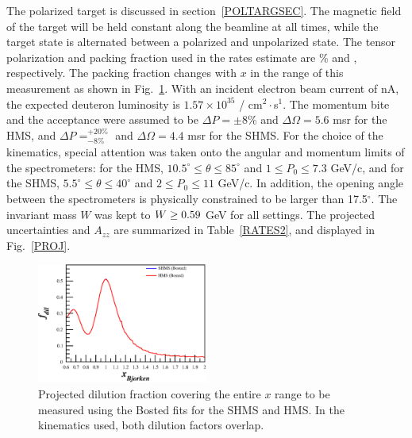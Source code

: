 The polarized \TARGET target is discussed in section~\ref{POLTARGSEC}.  The magnetic field of the target will be held constant along the beamline at all times, while the target state is alternated between a polarized and unpolarized state.
The tensor polarization and packing fraction used in the rates estimate are \PZZ\% and \PF, respectively. 
The packing fraction changes with $x$ in the range of this measurement as shown in Fig.~\ref{fdil_plot}.
With an incident
electron beam current of \CURRENT nA, the
expected deuteron luminosity is $1.57\times 10^{35}$ / cm$^2\cdot$s$^1$. The momentum bite and the acceptance
were assumed to be $\Delta P = \pm 8\%$ and $\Delta\Omega = 5.6$ msr for the HMS, and $\Delta P= ^{+20\%}_{-8\%}$ 
and $\Delta\Omega =4.4$ msr for the SHMS. 
%
For the choice of the kinematics,
special attention was taken onto the angular and momentum limits of the spectrometers: for the
HMS, $10.5^{\circ} \le \theta \le 85^{\circ}$ and $1 \le P_0 \le 7.3$ GeV/c, and for the SHMS,
$5.5^{\circ} \le \theta \le 40^{\circ}$ and $2 \le P_0 \le 11$ GeV/c. In addition, the
opening angle between the spectrometers is physically constrained to be larger than 17.5$^{\circ}$.
The invariant mass $W$ was kept to $W \ge 0.59$ GeV for all settings.
The projected 
uncertainties and $A_{zz}$
are summarized in Table~\ref{RATES2}, and displayed in
Fig.~\ref{PROJ}.  

\begin{figure}
\begin{center}
\includegraphics[width=0.5\textwidth]{figs/kine/Pzz_30_fdil.eps} 
\caption{\label{fdil_plot}Projected dilution fraction covering the entire $x$ range to be measured using the Bosted fits \cite{Bosted:2012qc} for the SHMS and HMS. In the kinematics used, both dilution factors overlap.}
\end{center}
\end{figure}

